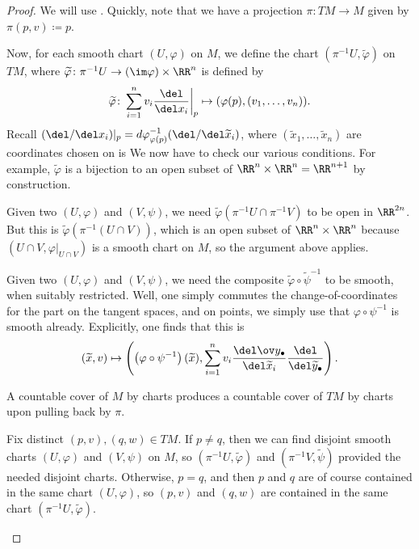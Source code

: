 \documentclass[../notes.tex]{subfiles}
\begin{document}
\begin{proof}
	We will use . Quickly, note that we have a projection $\pi\colon TM\to M$ given by $\pi(p,v)\coloneqq p$.

	Now, for each smooth chart $(U,\varphi)$ on $M$, we define the chart $\left(\pi^{-1}U,\widetilde\varphi\right)$ on $TM$, where $\widetilde\varphi\colon\pi^{-1}U\to(\im\varphi)\times\RR^n$ is defined by
	\[\widetilde\varphi\colon\sum_{i=1}^nv_i\frac{\del}{\del x_i}\bigg|_p\mapsto(\varphi(p),(v_1,\ldots,v_n)).\]
	Recall $(\del/\del x_i)|_p=d\varphi^{-1}_{\varphi(p)}(\del/\del\widetilde x_i)$, where $(\widetilde x_1,\ldots,\widetilde x_n)$ are coordinates chosen on  is  We now have to check our various conditions. For example, $\widetilde\varphi$ is a bijection to an open subset of $\RR^n\times\RR^n=\RR^{n+1}$ by construction.
	\begin{listroman}
		\item Given two $(U,\varphi)$ and $(V,\psi)$, we need $\widetilde\varphi\left(\pi^{-1}U\cap\pi^{-1}V\right)$ to be open in $\RR^{2n}$. But this is $\widetilde\varphi\left(\pi^{-1}(U\cap V)\right)$, which is an open subset of $\RR^n\times\RR^n$ because $(U\cap V,\varphi|_{U\cap V})$ is a smooth chart on $M$, so the argument above applies.
		\item Given two $(U,\varphi)$ and $(V,\psi)$, we need the composite $\widetilde\varphi\circ\widetilde\psi^{-1}$ to be smooth, when suitably restricted. Well, one simply commutes the change-of-coordinates for the part on the tangent spaces, and on points, we simply use that $\varphi\circ\psi^{-1}$ is smooth already. Explicitly, one finds that this is
		\[(\widetilde x,v)\mapsto\left(\left(\varphi\circ\psi^{-1}\right)(\widetilde x),\sum_{i=1}^nv_i\frac{\del\ov y_\bullet}{\del\widetilde x_i}\frac{\del}{\del\widetilde y_\bullet}\right).\]
		\item A countable cover of $M$ by charts produces a countable cover of $TM$ by charts upon pulling back by $\pi$.
		\item Fix distinct $(p,v),(q,w)\in TM$. If $p\ne q$, then we can find disjoint smooth charts $(U,\varphi)$ and $(V,\psi)$ on $M$, so $\left(\pi^{-1}U,\widetilde\varphi\right)$ and $\left(\pi^{-1}V,\widetilde\psi\right)$ provided the needed disjoint charts. Otherwise, $p=q$, and then $p$ and $q$ are of course contained in the same chart $(U,\varphi)$, so $(p,v)$ and $(q,w)$ are contained in the same chart $\left(\pi^{-1}U,\widetilde\varphi\right)$.
		\qedhere
	\end{listroman}
\end{proof}
\end{document}

